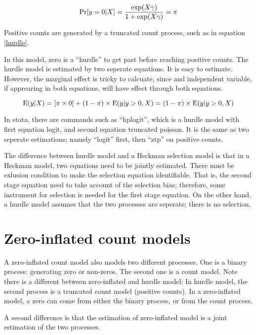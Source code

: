 \begin{equation}
{\rm Pr} [y=0 |  X]=\frac{\exp(X \gamma)}{1 + \exp(X \gamma)} = \pi  
\end{equation}

Positive counts are generated by a truncated count process, such as in
equation \ref{hurdle}.  

In this model, zero is a ``hurdle'' to get past before reaching
positive counts.  The hurdle model is estimated by two seperate
equations.  It is easy to estimate.  However, the marginal effect is
tricky to calcuate, since and independent variable, if apprearing in
both equations, will have effect through both equations.  

\begin{equation}
{\rm E} (y | X) = [\pi \times 0 ] + {(1-\pi) \times {\rm E} (y | y>0,
  X) } = (1- \pi) \times {\rm E} (y | y>0 , X)
\end{equation}


In stata, there are commands such as ``hplogit'', which is a hurdle
model with first equation logit, and second equation truncated
poisson.  It is the same as two seperate estimations; namely ``logit''
first, then ``ztp'' on positive counts.

The difference between hurdle model and a Heckman selection model is
that in a Heckman model, two equations need to be jointly estimated.
There must be exlusion condition to make the selection
equation identifiable.  That is, the second stage equation need to
take account of the selection bias; therefore, some instrument for
selection is needed for the first stage equation.  On the other hand,
a hurdle model assumes that the two processes are seperate; there is
no selection.

\section{Zero-inflated count models}

A zero-inflated count model also models two different processes.  One
is a binary process: generating zero or non-zeros.  The second one is
a count model.  Note there is a different between zero-inflated and
hurdle model:  In hurdle model, the second process is a truncated
count model (positive counts).  In a zero-inflated model, a zero can
come from either the binary process, or from the count process.  

A second difference is that the estimation of zero-inflated model is a
joint estimation of the two processes.  

